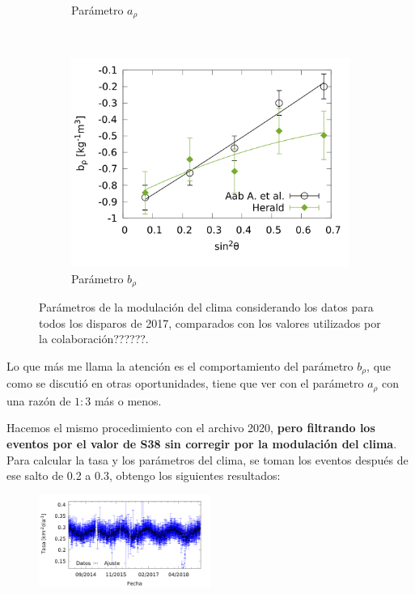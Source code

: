 \begin{figure}[H]
\begin{subfigure}[b]{0.5\textwidth}
          \caption{Parámetro $a_{\rho}$ }
          \label{fig:arho_2017_1EeV}
          \end{subfigure}\\
          \begin{subfigure}[b]{\textwidth}
          \centering
          \includegraphics[width=0.5\linewidth]{../03_IntroduccionReport/params/brho_2017_above_1EeV.png}
          \caption{Parámetro  $b_\rho$   }
          \label{fig:brho_2017_1EeV}
          \end{subfigure}%
          \caption{Parámetros de la modulación del clima considerando los datos para todos los disparos de 2017, comparados con los valores utilizados por la colaboración??????.}\label{fig:parameters_2017_1EeV}
        \end{figure}

        Lo que más me llama la atención es el comportamiento del parámetro $b_\rho$, que como se discutió en otras oportunidades, tiene que ver con el parámetro $a_\rho$ con una razón de  $1:3$ más o menos. 



      Hacemos el mismo procedimiento con el archivo 2020, {\bf pero filtrando los eventos por el valor de S38 sin corregir por la modulación del clima}. Para calcular la tasa y los parámetros del clima, se toman los eventos después de ese salto de 0.2 a 0.3, obtengo los siguientes resultados:

        \begin{figure}[H]
          \centering
          \includegraphics[width=0.5\textwidth]{../03_IntroduccionReport/daily_rate/daily_rate_AllTriggers_2020_1EeV.png}
        \end{figure}

